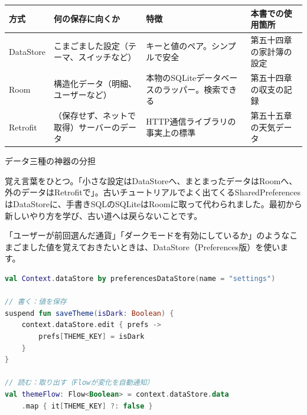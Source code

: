 


\begin{center}
\begin{tabularx}{\linewidth}{|X|X|X|X|}
\hline
\textbf{方式} & \textbf{何の保存に向くか} & \textbf{特徴} & \textbf{本書での使用箇所} \tabularnewline
\hline
DataStore & こまごました設定（テーマ、スイッチなど） & キーと値のペア。シンプルで安全 & 第五十四章の家計簿の設定 \tabularnewline
Room & 構造化データ（明細、ユーザーなど） & 本物のSQLiteデータベースのラッパー。検索できる & 第五十四章の収支の記録 \tabularnewline
Retrofit & （保存せず、ネットで取得）サーバーのデータ & HTTP通信ライブラリの事実上の標準 & 第五十五章の天気データ \tabularnewline
\hline
\end{tabularx}
\end{center}

\begin{center}\small\color{gray}データ三種の神器の分担\end{center}

覚え言葉をひとつ。「小さな設定はDataStoreへ、まとまったデータはRoomへ、外のデータはRetrofitで」。古いチュートリアルでよく出てくるSharedPreferencesはDataStoreに、手書きSQLのSQLiteはRoomに取って代わられました。最初から新しいやり方を学び、古い道へは戻らないことです。


「ユーザーが前回選んだ通貨」「ダークモードを有効にしているか」のようなこまごました値を覚えておきたいときは、DataStore（Preferences版）を使います。

\begin{lstlisting}[language=Kotlin]
val Context.dataStore by preferencesDataStore(name = "settings")

// 書く：値を保存
suspend fun saveTheme(isDark: Boolean) {
    context.dataStore.edit { prefs ->
        prefs[THEME_KEY] = isDark
    }
}

// 読む：取り出す（Flowが変化を自動通知）
val themeFlow: Flow<Boolean> = context.dataStore.data
    .map { it[THEME_KEY] ?: false }
\end{lstlisting}

